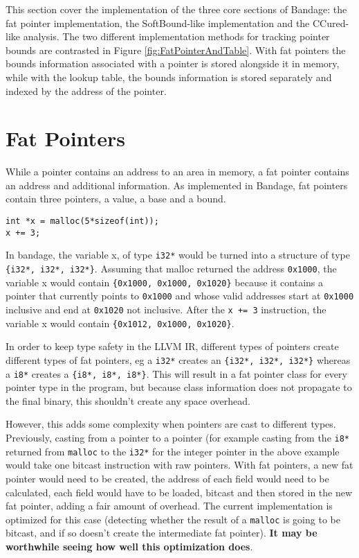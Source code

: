 This section cover the implementation of the three core sections of Bandage: the fat pointer implementation, the SoftBound-like implementation and the CCured-like analysis.
The two different implementation methods for tracking pointer bounds are contrasted in Figure \ref{fig:FatPointerAndTable}.
With fat pointers the bounds information associated with a pointer is stored alongside it in memory, while with the lookup table, the bounds information is stored separately and indexed by the address of the pointer.


\section{Fat Pointers}
While a pointer contains an address to an area in memory, a fat pointer contains an address and additional information.
As implemented in Bandage, fat pointers contain three pointers, a value, a base and a bound.

\begin{verbatim}
int *x = malloc(5*sizeof(int));
x += 3;
\end{verbatim}

In bandage, the variable x, of type \verb!i32*! would be turned into a structure of type \verb!{i32*, i32*, i32*}!.
Assuming that malloc returned the address \verb!0x1000!, the variable x would contain \verb!{0x1000, 0x1000, 0x1020}! because it contains a pointer that currently points to \verb!0x1000! and whose valid addresses start at \verb!0x1000! inclusive and end at \verb!0x1020! not inclusive.
After the \verb!x += 3! instruction, the variable x would contain \verb!{0x1012, 0x1000, 0x1020}!.

In order to keep type safety in the LLVM IR, different types of pointers create different types of fat pointers, eg a \verb!i32*! creates an \verb!{i32*, i32*, i32*}! whereas a \verb!i8*! creates a \verb!{i8*, i8*, i8*}!.
This will result in a fat pointer class for every pointer type in the program, but because class information does not propagate to the final binary, this shouldn't create any space overhead.

However, this adds some complexity when pointers are cast to different types.
Previously, casting from a pointer to a pointer (for example casting from the \verb!i8*! returned from \verb!malloc! to the \verb!i32*! for the integer pointer in the above example would take one bitcast instruction with raw pointers.
With fat pointers, a new fat pointer would need to be created, the address of each field would need to be calculated, each field would have to be loaded, bitcast and then stored in the new fat pointer, adding a fair amount of overhead.
The current implementation is optimized for this case (detecting whether the result of a \verb!malloc! is going to be bitcast, and if so doesn't create the intermediate fat pointer).
\textbf{It may be worthwhile seeing how well this optimization does}.

